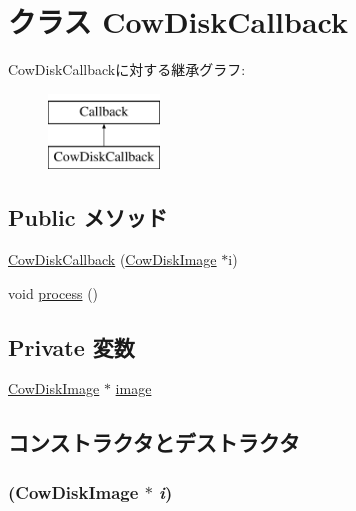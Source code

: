 \hypertarget{classCowDiskCallback}{
\section{クラス CowDiskCallback}
\label{classCowDiskCallback}
}
CowDiskCallbackに対する継承グラフ:\begin{figure}[H]
\begin{center}
\leavevmode
\includegraphics[height=2cm]{classCowDiskCallback}
\end{center}
\end{figure}
\subsection*{Public メソッド}
\begin{DoxyCompactItemize}
\item 
\hyperlink{classCowDiskCallback_aac8eb90cdd6cca93eadd109b081a8701}{CowDiskCallback} (\hyperlink{classCowDiskImage}{CowDiskImage} $\ast$i)
\item 
void \hyperlink{classCowDiskCallback_a2e9c5136d19b1a95fc427e0852deab5c}{process} ()
\end{DoxyCompactItemize}
\subsection*{Private 変数}
\begin{DoxyCompactItemize}
\item 
\hyperlink{classCowDiskImage}{CowDiskImage} $\ast$ \hyperlink{classCowDiskCallback_a1d52b13d96a394b1f96e76708456ee27}{image}
\end{DoxyCompactItemize}


\subsection{コンストラクタとデストラクタ}
\hypertarget{classCowDiskCallback_aac8eb90cdd6cca93eadd109b081a8701}{
\subsubsection[{CowDiskCallback}]{ ({\bf CowDiskImage} $\ast$ {\em i})}}
\label{classCowDiskCallback_aac8eb90cdd6cca93eadd109b081a8701}



